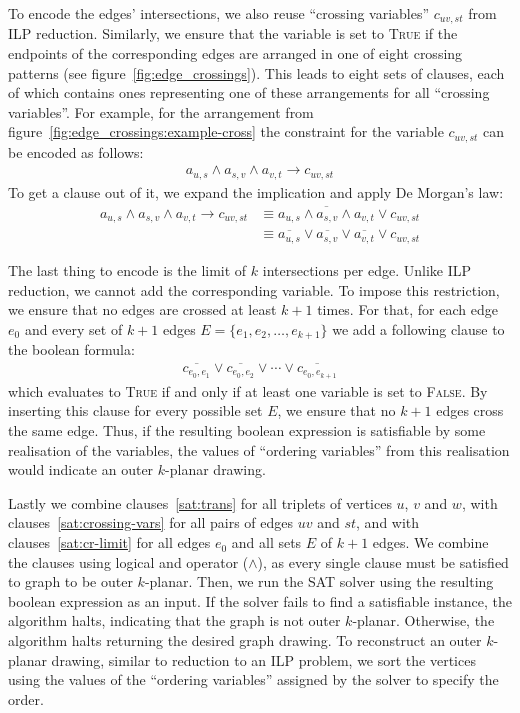 To encode the edges' intersections, we also reuse ``crossing variables'' \(c_{uv, st}\) from ILP reduction. Similarly, we ensure that the variable is set to \textsc{True} if the endpoints of the corresponding edges are arranged in one of eight crossing patterns (see figure~\ref{fig:edge_crossings}). This leads to eight sets of clauses, each of which contains ones representing one of these arrangements for all ``crossing variables''. For example, for the arrangement from figure~\ref{fig:edge_crossings:example-cross} the constraint for the variable \(c_{uv, st}\) can be encoded as follows:
\begin{align*}
    a_{u,s} \land a_{s,v} \land a_{v,t} \rightarrow c_{uv, st}
\end{align*}
To get a clause out of it, we expand the implication and apply De Morgan's law:
\begin{align}
    a_{u,s} \land a_{s,v} \land a_{v,t} \rightarrow c_{uv, st}
    & \equiv \overline{a_{u,s} \land a_{s,v} \land a_{v,t}} \lor c_{uv, st} \nonumber \\
    & \equiv \overline{a_{u,s}} \lor \overline{a_{s,v}} \lor \overline{a_{v,t}} \lor c_{uv, st} \label{sat:crossing-vars}
\end{align}

The last thing to encode is the limit of \(k\) intersections per edge. Unlike ILP reduction, we cannot add the corresponding variable. To impose this restriction, we ensure that no edges are crossed at least \(k+1\) times. For that, for each edge \(e_0\) and every set of \(k+1\) edges \(E = \{e_1, e_2, \dots, e_{k+1}\}\) we add a following clause to the boolean formula:
\begin{align}
    \overline{c_{e_0, e_1}} \lor \overline{c_{e_0, e_2}} \lor \cdots \lor \overline{c_{e_0, e_{k+1}}} \label{sat:cr-limit}
\end{align}
which evaluates to \textsc{True} if and only if at least one variable is set to \textsc{False}. By inserting this clause for every possible set \(E\), we ensure that no \(k+1\) edges cross the same edge. Thus, if the resulting boolean expression is satisfiable by some realisation of the variables, the values of ``ordering variables'' from this realisation would indicate an outer \(k\)-planar drawing.

Lastly we combine clauses~\eqref{sat:trans} for all triplets of vertices \(u\), \(v\) and \(w\), with clauses~\eqref{sat:crossing-vars} for all pairs of edges \(uv\) and \(st\), and with clauses~\eqref{sat:cr-limit} for all edges \(e_0\) and all sets \(E\) of \(k+1\) edges. We combine the clauses using logical and operator (\(\land\)), as every single clause must be satisfied to graph to be outer \(k\)-planar. Then, we run the SAT solver using the resulting boolean expression as an input. If the solver fails to find a satisfiable instance, the algorithm halts, indicating that the graph is not outer \(k\)-planar. Otherwise, the algorithm halts returning the desired graph drawing. To reconstruct an outer \(k\)-planar drawing, similar to reduction to an ILP problem, we sort the vertices using the values of the ``ordering variables'' assigned by the solver to specify the order.

